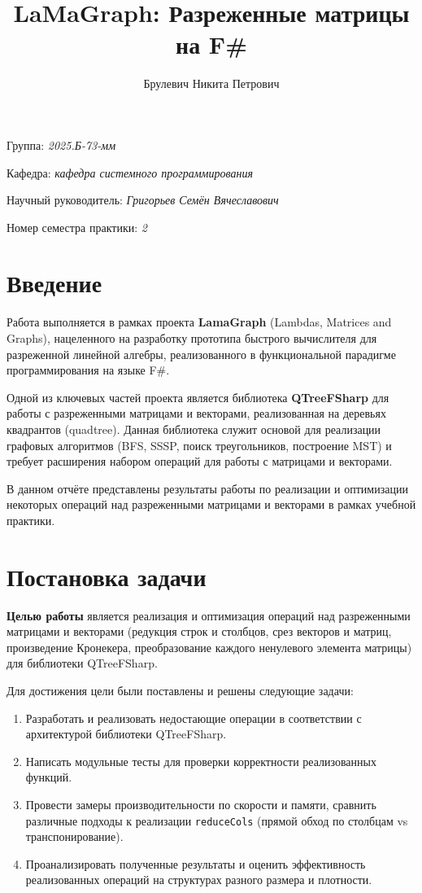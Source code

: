 \documentclass[a4paper]{article}
\title{LaMaGraph: Разреженные матрицы на F\#}
\author{Брулевич Никита Петрович}
\date{}
\begin{document}
\sloppy

\maketitle

\begin{flushright}
    Группа: \emph{2025.Б-73-мм}

    Кафедра: \emph{кафедра системного программирования}

    Научный руководитель: \emph{Григорьев Семён Вячеславович}

    Номер семестра практики: \emph{2}
\end{flushright}

\section*{Введение}

Работа выполняется в рамках проекта \textbf{LamaGraph} (Lambdas, Matrices and Graphs), нацеленного на разработку прототипа быстрого вычислителя для разреженной линейной алгебры, реализованного в функциональной парадигме программирования на языке F\#.

Одной из ключевых частей проекта является библиотека \textbf{QTreeFSharp} для работы с разреженными матрицами и векторами, реализованная на деревьях квадрантов (quadtree). Данная библиотека служит основой для реализации графовых алгоритмов (BFS, SSSP, поиск треугольников, построение MST) и требует расширения набором операций для работы с матрицами и векторами.

В данном отчёте представлены результаты работы по реализации и оптимизации некоторых операций над разреженными матрицами и векторами в рамках учебной практики.

\section{Постановка задачи}

\textbf{Целью работы} является реализация и оптимизация операций над разреженными матрицами и векторами (редукция строк и столбцов, срез векторов и матриц, произведение Кронекера, преобразование каждого ненулевого элемента матрицы) для библиотеки QTreeFSharp.

Для достижения цели были поставлены и решены следующие задачи:
\begin{enumerate}
    \item Разработать и реализовать недостающие операции в соответствии с архитектурой библиотеки QTreeFSharp.
    \item Написать модульные тесты для проверки корректности реализованных функций.
    \item Провести замеры производительности по скорости и памяти, сравнить различные подходы к реализации \texttt{reduceCols} (прямой обход по столбцам vs транспонирование).
    \item Проанализировать полученные результаты и оценить эффективность реализованных операций на структурах разного размера и плотности.
\end{enumerate}
\end{document}
